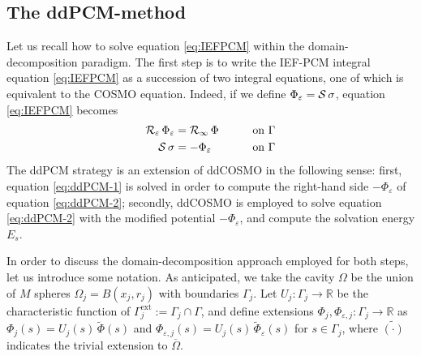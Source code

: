 \subsection{The ddPCM-method}


Let us recall how to solve equation \eqref{eq:IEFPCM} within the domain-decomposition paradigm. The first step is to write the IEF-PCM integral equation \eqref{eq:IEFPCM} as a succession of two integral equations, one of which is equivalent to the COSMO equation\cite{Cances_Librone_PCM}. Indeed, if we define $\Phi_\varepsilon = \mathcal{S} \, \sigma$, equation \eqref{eq:IEFPCM} becomes
\begin{alignat}{3}
\mathcal{R}_\varepsilon \, \Phi_\varepsilon & = \mathcal{R}_\infty \, \Phi \qquad && \text{on }\Gamma  \label{eq:ddPCM-1} \\
\mathcal{S} \, \sigma & = -\Phi_\varepsilon  && \text{on }\Gamma \label{eq:ddPCM-2} 
\end{alignat}
The ddPCM strategy is an extension of ddCOSMO in the following sense: first, equation \eqref{eq:ddPCM-1} is solved in order to compute the right-hand side $-\Phi_\varepsilon$ of equation \eqref{eq:ddPCM-2}; secondly, ddCOSMO is employed to solve equation \eqref{eq:ddPCM-2} with the modified potential $-\Phi_\varepsilon$, and compute the solvation energy $E_s$.

In order to discuss the domain-decomposition approach employed for both steps, let us introduce some notation. As anticipated, we take the cavity $\Omega$ be the union of $M$ spheres $\Omega_j = B(x_j, r_j)$ with boundaries $\Gamma_j$. Let $U_j: \Gamma_j \to \mathbb{R}$ be the characteristic function of $\Gamma_j^\text{ext}:= \Gamma_j \cap \Gamma$, and define extensions $\Phi_j , \Phi_{\varepsilon,j} : \Gamma_j \to \mathbb{R}$ as  $\Phi_j (s)= U_j(s) \, \widetilde{\Phi}(s)$ and $\Phi_{\varepsilon,j}(s)= U_j(s) \, \widetilde{\Phi}_{\varepsilon}(s)$ for $s \in \Gamma_j$, where $\tilde{(\cdot)}$ indicates the trivial extension to $\overline{\Omega}$.


